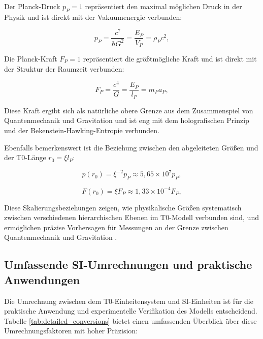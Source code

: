 \documentclass[twocolumn,aps,prl]{revtex4-2}
\begin{document}
		Der Planck-Druck $p_P = 1$ repräsentiert den maximal möglichen Druck in der Physik und ist direkt mit der Vakuumenergie verbunden:
		
		\begin{equation}
			p_P = \frac{c^7}{\hbar G^2} = \frac{E_P}{V_P} = \rho_P c^2, \label{eq:planck_pressure}
		\end{equation}
		
		Die Planck-Kraft $F_P = 1$ repräsentiert die größtmögliche Kraft und ist direkt mit der Struktur der Raumzeit verbunden:
		
		\begin{equation}
			F_P = \frac{c^4}{G} = \frac{E_P}{l_P} = m_P a_P, \label{eq:planck_force}
		\end{equation}
		
		Diese Kraft ergibt sich als natürliche obere Grenze aus dem Zusammenspiel von Quantenmechanik und Gravitation und ist eng mit dem holografischen Prinzip und der Bekenstein-Hawking-Entropie verbunden.
		
		Ebenfalls bemerkenswert ist die Beziehung zwischen den abgeleiteten Größen und der T0-Länge $r_0 = \xi l_P$:
		
		\begin{equation}
			p(r_0) = \xi^{-2} p_P \approx 5,65 \times 10^7 p_P, \label{eq:r0_pressure}
		\end{equation}
		
		\begin{equation}
			F(r_0) = \xi F_P \approx 1,33 \times 10^{-4} F_P, \label{eq:r0_force}
		\end{equation}
		
		Diese Skalierungsbeziehungen zeigen, wie physikalische Größen systematisch zwischen verschiedenen hierarchischen Ebenen im T0-Modell verbunden sind, und ermöglichen präzise Vorhersagen für Messungen an der Grenze zwischen Quantenmechanik und Gravitation \cite{pascher_emergente_2025}.
		
		\subsection{Umfassende SI-Umrechnungen und praktische Anwendungen}
		\label{subsec:detailed_conversions}
		
		Die Umrechnung zwischen dem T0-Einheitensystem und SI-Einheiten ist für die praktische Anwendung und experimentelle Verifikation des Modells entscheidend. Tabelle \ref{tab:detailed_conversions} bietet einen umfassenden Überblick über diese Umrechnungsfaktoren mit hoher Präzision:
		
\end{document}
